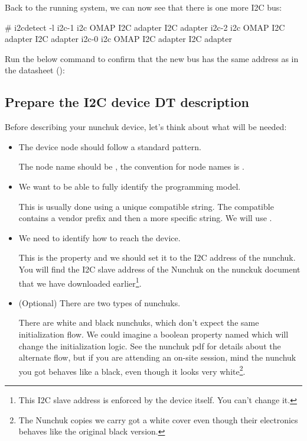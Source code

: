 Back to the running system, we can now see that there is one more
I2C bus:

\begin{bashinput}
# i2cdetect -l
i2c-1	i2c             OMAP I2C adapter                        I2C adapter
i2c-2	i2c             OMAP I2C adapter                        I2C adapter
i2c-0	i2c             OMAP I2C adapter                        I2C adapter
\end{bashinput}

Run the below command to confirm that the new bus has the same address
as in the datasheet ():


\subsection{Prepare the I2C device DT description}

Before describing your nunchuk device, let's think about what will be
needed:
\begin{itemize}
\item The device node should follow a standard pattern.

  The node name should be , the convention for node
  names is .

\item We want to be able to fully identify the programming model.

  This is usually done using a unique compatible string. The compatible
  contains a vendor prefix and then a more specific string. We will use
  .

\item We need to identify how to reach the device.

  This is the  property and we should set it to the I2C
  address of the nunchuk. You will find the I2C slave address of the
  Nunchuk on the nunckuk document that we have downloaded
  earlier\footnote{This I2C slave address is enforced by the device
    itself. You can't change it.}.

\item (Optional) There are two types of nunchuks.

  There are white and black nunchuks, which don't expect the same
  initialization flow. We could imagine a boolean property named
   which will change the initialization
  logic. See the nunchuk pdf for details about the alternate flow, but if you
  are attending an on-site session, mind the nunchuk you got behaves like a
  black, even though it looks very white\footnote{The Nunchuk copies we
  carry got a white cover even though their electronics behaves like the
  original black version.}.

\end{itemize}

